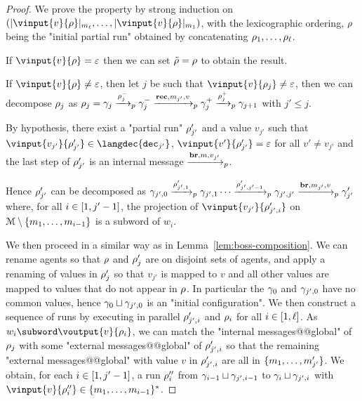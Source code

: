 \begin{proof}
	We prove the property by strong induction on $(\size{\vinput{v}{\run}}_{m_\ell}, \ldots, \size{\vinput{v}{\run}}_{m_1})$, with the lexicographic ordering, $\rho$ being the "initial partial run" obtained by concatenating $\rho_1, \ldots, \rho_\ell$.
	
	If $\vinput{v}{\run} = \epsilon$ then we can set $\Tilde{\rho} = \rho$ to obtain the result.
	
	If $\vinput{v}{\run} \neq \epsilon$, then let $j$ be such that $\vinput{v}{\run_j} \neq \epsilon$, then we can decompose $\rho_j$ as $\rho_j = \gamma_{j} \xrightarrow{\rho_j^-}_{p} \gamma_j^- \xrightarrow{\textbf{rec}, m_{j'}, v}_{p} \gamma_j^+ \xrightarrow{\rho_j^+}_{p} \gamma_{j+1}$ with $j'\leq j$. 
	
	By hypothesis, there exist a "partial run" $\rho'_{j'}$ and a value $v_{j'}$ such that $\vinput{v_{j'}}{\run'_{j'}} \in \langdec{\decsymb_{j'}}$,  $\vinput{v'}{\run'_{j'}} = \varepsilon$ for all $v' \neq v_{j'}$  and the last step of $\rho'_{j'}$ is an internal message $\xrightarrow{\textbf{br}, m, v_{j'}}_{p}$.
	
	Hence $\rho'_{j'}$ can be decomposed as $\gamma_{{j'},0} \xrightarrow{\rho_{{j'},1}'}_{p} \gamma_{{j'},1} \cdots \xrightarrow{\rho_{{j'},j'-1}'}_{p} \gamma_{{j'},j'} \xrightarrow{\textbf{br}, m_{j'}, v}_{p} \gamma'_{j'}$ where, for all $i \in [1,j'-1]$, the projection of $\vinput{v_{j'}}{\run_{{j'},i}'}$ on ${\mathcal{M}\setminus\{m_1, \ldots, m_{{i}-1}\}}$ is a subword of $w_i$. 
	
	We then proceed in a similar way as in Lemma~\ref{lem:boss-composition}.
	We can rename agents so that $\rho$ and $\rho'_j$ are on disjoint sets of agents, and apply a renaming of values in $\rho_j'$ so that $v_{j'}$ is mapped to $v$ and all other values are mapped to values that do not appear in $\rho$. In particular the $\gamma_0$ and $\gamma_{j',0}$ have no common values, hence $\gamma_0 \sqcup \gamma_{j',0}$ is an "initial configuration".
	We then construct a sequence of runs by executing in parallel $\rho_{j',i}'$ and $\rho_i$ for all $i\in[1,\ell]$. As $w_i \subword \voutput{v}{\run_i}$, we can match the "internal messages@@global" of $\rho_j$ with some "external messages@@global" of $\rho'_{j',i}$ so that the remaining "external messages@@global" with value $v$ in $\rho'_{j',i}$ are all in $\{m_1, \ldots, m'_{j'}\}$. 
	We obtain, for each $i \in [1,j'-1]$, a run $\rho''_i$ from $\gamma_{i-1} \sqcup \gamma_{j', i-1}$ to $\gamma_{i} \sqcup \gamma_{j', i}$ with $\vinput{v}{\run''_i} \in \set{m_1, \ldots, m_{i-1}}^*$. 
	

\end{proof}
